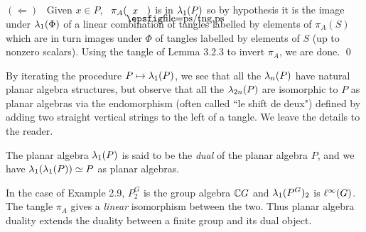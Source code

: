 $(\Leftarrow)$ \ Given $x\in P$, \ $\pi_A(\tangle{x})$
is in $\lambda_1(P)$ so by hypothesis it is the image under
$\lambda_1(\Phi)$ of a linear combination of tangles  labelled by
elements of $\pi_A(S)$ which are in turn images under $\Phi$ of
tangles  labelled by
elements of $S$ (up to nonzero scalars). Using the tangle of Lemma
3.2.3 to invert $\pi_A$, we are done. \qed

\bs By iterating the procedure $P\mapsto\lambda_1(P)$, we see that all
the $\lambda_n(P)$ have natural planar algebra structures, but observe
that all the $\lambda_{2n}(P)$ are isomorphic to $P$ as planar algebras
via the endomorphism (often called ``le shift de deux") defined by
adding two straight vertical strings to the left of a tangle. We
leave the details to the reader.

The planar algebra $\lambda_1(P)$ is said to be the {\it dual}
of the planar algebra $P$, and we have $\lambda_1(\lambda_1(P))\simeq P$
as planar algebras.

In the case of Example 2.9, $P^G_2$ is the group algebra
$\Bbb C G$ and $\lambda_1(P^G)_2$ is $\ell^\infty(G)$. The tangle $\pi_A$
gives a {\it linear} isomorphism between the two. Thus planar
algebra duality extends the duality between a finite group and its
dual object.




